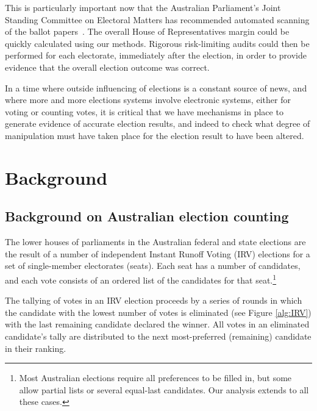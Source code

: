 \documentclass{article}
\begin{document}
This is particularly important now that the Australian Parliament's Joint Standing Committee on Electoral Matters has recommended automated scanning of the ballot papers~\cite{JSCEMInterim3}.  The overall House of Representatives margin could be quickly calculated using our methods.  Rigorous risk-limiting audits could then be performed for each electorate, immediately after the election, in order to provide evidence that the overall election outcome was correct.

In a time where outside influencing of elections is a constant source of news, and where more and more elections systems involve electronic systems, either for voting or counting votes, it is critical that we have mechanisms in place to generate evidence of accurate election results, and indeed to check what degree of manipulation must have taken place for the election result to have been altered.  

\section{Background}
\subsection{Background on Australian election counting}

The lower houses of parliaments in the Australian federal and state elections are the result of a number of independent Instant Runoff Voting (IRV) elections for 
a set of single-member electorates (seats).
Each seat has a number of candidates, and 
each vote consists of
an ordered list of the candidates for that seat.\footnote{Most Australian elections require all preferences to be filled in, but some allow partial lists or several equal-last candidates.  Our analysis extends to all these cases.} 

The tallying of votes in an IRV election proceeds by a series of rounds in
which the candidate with the lowest number of votes is eliminated (see
Figure \ref{alg:IRV}) with the last remaining candidate declared the winner.
All votes in an eliminated candidate's  tally are distributed to the next 
most-preferred (remaining) candidate in their ranking. 
\end{document}
